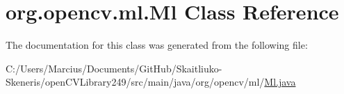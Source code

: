 \hypertarget{classorg_1_1opencv_1_1ml_1_1_ml}{}\section{org.\+opencv.\+ml.\+Ml Class Reference}
\label{classorg_1_1opencv_1_1ml_1_1_ml}


The documentation for this class was generated from the following file\+:\begin{DoxyCompactItemize}
\item 
C\+:/\+Users/\+Marcius/\+Documents/\+Git\+Hub/\+Skaitliuko-\/\+Skeneris/open\+C\+V\+Library249/src/main/java/org/opencv/ml/\mbox{\hyperlink{_ml_8java}{Ml.\+java}}\end{DoxyCompactItemize}
